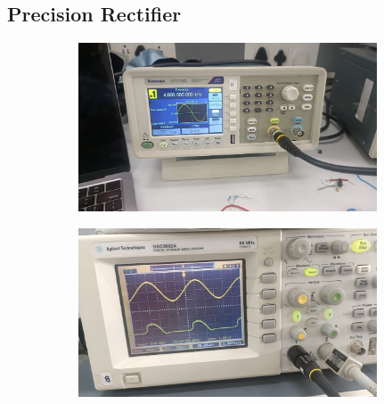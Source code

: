 \documentclass[a4paper,12pt]{article}
\begin{document}
\subsection*{Precision Rectifier}
\begin{figure}[H]
    \centering
    \begin{subfigure}{0.5\textwidth}
        \centering
        \includegraphics[height=5cm]{figs/5.3/para.jpeg}
    \end{subfigure}%
    \begin{subfigure}{0.5\textwidth}
        \centering
        \includegraphics[height=5cm]{figs/5.3/plot.jpeg}
    \end{subfigure}
\end{figure}
\end{document}
